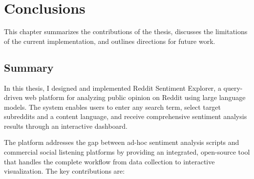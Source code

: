 \chapter{Conclusions}
\label{ch:conclusions}

This chapter summarizes the contributions of the thesis, discusses the limitations of the current implementation, and outlines directions for future work.

\section{Summary}
\label{sec:summary}

In this thesis, I designed and implemented Reddit Sentiment Explorer, a query-driven web platform for analyzing public opinion on Reddit using large language models. The system enables users to enter any search term, select target subreddits and a content language, and receive comprehensive sentiment analysis results through an interactive dashboard.

The platform addresses the gap between ad-hoc sentiment analysis scripts and commercial social listening platforms by providing an integrated, open-source tool that handles the complete workflow from data collection to interactive visualization. The key contributions are:

